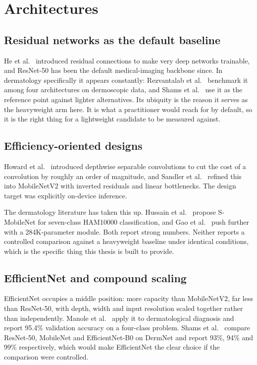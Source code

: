 \section{Architectures}
\label{sec:lit-arch}

\subsection{Residual networks as the default baseline}

He et al.~\cite{he2016resnet} introduced residual connections to make very deep networks
trainable, and ResNet-50 has been the default medical-imaging backbone since. In
dermatology specifically it appears constantly: Rezvantalab et
al.~\cite{rezvantalab2020dermoscopy} benchmark it among four architectures on
dermoscopic data, and Shams et al.~\cite{shams2025jcmr} use it as the reference point
against lighter alternatives. Its ubiquity is the reason it serves as the heavyweight
arm here. It is what a practitioner would reach for by default, so it is the right thing
for a lightweight candidate to be measured against.

\subsection{Efficiency-oriented designs}

Howard et al.~\cite{howard2017mobilenets} introduced depthwise separable convolutions to
cut the cost of a convolution by roughly an order of magnitude, and Sandler et
al.~\cite{sandler2018mobilenetv2} refined this into MobileNetV2 with inverted residuals
and linear bottlenecks. The design target was explicitly on-device inference.

The dermatology literature has taken this up. Hussain et al.~\cite{eswa2024e2e} propose
S-MobileNet for seven-class HAM10000 classification, and Gao et
al.~\cite{gao2024skinlitenet} push further with a 284K-parameter module. Both report
strong numbers. Neither reports a controlled comparison against a heavyweight baseline
under identical conditions, which is the specific thing this thesis is built to provide.

\subsection{EfficientNet and compound scaling}

EfficientNet occupies a middle position: more capacity than MobileNetV2, far less than
ResNet-50, with depth, width and input resolution scaled together rather than
independently. Manole et al.~\cite{manole2024efficientnet} apply it to dermatological
diagnosis and report 95.4\% validation accuracy on a four-class problem. Shams et
al.~\cite{shams2025jcmr} compare ResNet-50, MobileNet and EfficientNet-B0 on DermNet and
report 93\%, 94\% and 99\% respectively, which would make EfficientNet the clear choice
if the comparison were controlled.

